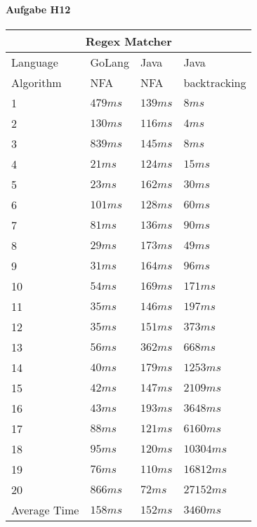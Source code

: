 \documentclass[11pt]{article}
\begin{document}
%
%
\paragraph{Aufgabe H12}
\begin{center}
\begin{tabular}{ |p{3cm}||p{2cm}|p{2cm}|p{2cm}|  }
 \hline
 \multicolumn{4}{|c|}{Regex Matcher} \\
 \hline
 Language & GoLang & Java & Java\\
 \hline
 Algorithm & NFA & NFA & backtracking\\
 \hline
 1	&	$479 ms$	&	$139 ms$	&	$8 ms$\\
 2	&	$130 ms$	&	$116 ms$	&	$4 ms$\\
 3	&	$839 ms$	&	$145 ms$	&	$8 ms$\\
 4	&	$21 ms$	&	$124 ms$	&	$15 ms$\\
 5	&	$23 ms$	&	$162 ms$	&	$30 ms$\\
 6	&	$101 ms$	&	$128 ms$	&	$60 ms$\\
 7	&	$81 ms$	&	$136 ms$	&	$90 ms$\\
 8	&	$29 ms$	&	$173 ms$	&	$49 ms$\\
 9	&	$31 ms$	&	$164 ms$	&	$96 ms$\\
 10	&	$54 ms$	&	$169 ms$	&	$171 ms$\\
 11	&	$35 ms$	&	$146 ms$	&	$197 ms$\\
 12	&	$35 ms$	&	$151 ms$	&	$373 ms$\\
 13	&	$56 ms$	&	$362 ms$	&	$668 ms$\\
 14	&	$40 ms$	&	$179 ms$	&	$1253 ms$\\
 15	&	$42 ms$	&	$147 ms$	&	$2109 ms$\\
 16	&	$43 ms$	&	$193 ms$	&	$3648 ms$\\
 17	&	$88 ms$	&	$121 ms$	&	$6160 ms$\\
 18	&	$95 ms$	&	$120 ms$	&	$10304 ms$\\
 19	&	$76 ms$	&	$110 ms$	&	$16812 ms$\\
 20	&	$866 ms$	&	$72 ms$	&	$27152 ms$\\
 \hline
 Average Time	&	$158 ms$	&	$152 ms$	&	$3460 ms$\\
 \hline
\end{tabular}
\end{center}
\end{document}
